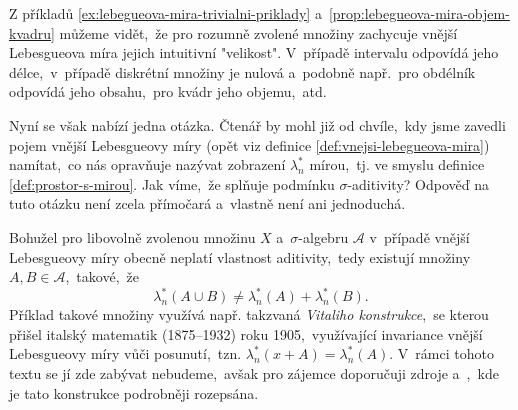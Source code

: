 Z příkladů \ref{ex:lebegueova-mira-trivialni-priklady} a~\ref{prop:lebegueova-mira-objem-kvadru} můžeme vidět,~že pro rozumně zvolené množiny zachycuje vnější Lebesgueova míra jejich intuitivní "velikost". V~případě intervalu odpovídá jeho délce,~v~případě diskrétní množiny je nulová a~podobně např.~pro obdélník odpovídá jeho obsahu,~pro kvádr jeho objemu,~atd.

Nyní se však nabízí jedna otázka. Čtenář by mohl již od chvíle,~kdy jsme zavedli pojem vnější Lebesgueovy míry (opět viz definice \ref{def:vnejsi-lebegueova-mira}) namítat,~co nás opravňuje nazývat zobrazení $\lambda_n^*$ mírou,~tj. ve smyslu definice \ref{def:prostor-s-mirou}. Jak víme,~že splňuje podmínku $\sigma$-aditivity? Odpověď na tuto otázku není zcela přímočará a~vlastně není ani jednoduchá.

Bohužel pro libovolně zvolenou množinu $X$ a~$\sigma$-algebru $\mathcal{A}$ v~případě vnější Lebesgueovy míry obecně neplatí vlastnost aditivity,~tedy existují množiny $A,B\in\mathcal{A}$,~takové,~že
\[\lambda_n^*(A\cup B)\neq\lambda_n^*(A)+\lambda_n^*(B).\]
Příklad takové množiny využívá např. takzvaná \emph{Vitaliho konstrukce},~se kterou přišel italský matematik  (1875--1932) roku 1905,~využívající invariance vnější Lebesgueovy míry vůči posunutí,~tzn. $\lambda_n^*(x+A)=\lambda_n^*(A)$. \cite{OConnor2025} V~rámci tohoto textu se jí zde zabývat nebudeme,~avšak pro zájemce doporučuji zdroje \citep[str. 3]{Lukes2013} a~\cite{Verner2025},~kde je tato konstrukce podrobněji rozepsána.

